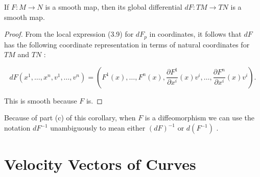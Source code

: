 \begin{proposition}
\label{prop:3-21}
\mathlibok
{}
If $F : M \rightarrow  N$ is a smooth map, then its global differential ${dF} : {TM} \rightarrow  {TN}$ is a smooth map.
\end{proposition}

\begin{proof}
From the local expression (3.9) for $d{F}_{p}$ in coordinates, it follows that ${dF}$ has the following coordinate representation in terms of natural coordinates for ${TM}$ and ${TN}$ :

\[
{dF}\left( {{x}^{1},\ldots ,{x}^{n},{v}^{1},\ldots ,{v}^{n}}\right)  = \left( {{F}^{1}\left( x\right) ,\ldots ,{F}^{n}\left( x\right) ,\frac{\partial {F}^{1}}{\partial {x}^{i}}\left( x\right) {v}^{i},\ldots ,\frac{\partial {F}^{n}}{\partial {x}^{i}}\left( x\right) {v}^{i}}\right) .
\]

This is smooth because $F$ is.
\end{proof}

\begin{notation}
\label{not:3-16-extra-4}
\leanok
Because of part (c) of this corollary, when $F$ is a diffeomorphism we can use the notation $d{F}^{-1}$ unambiguously to mean either ${\left( dF\right) }^{-1}$ or $d\left( {F}^{-1}\right)$ .
\end{notation}


\section{Velocity Vectors of Curves}

